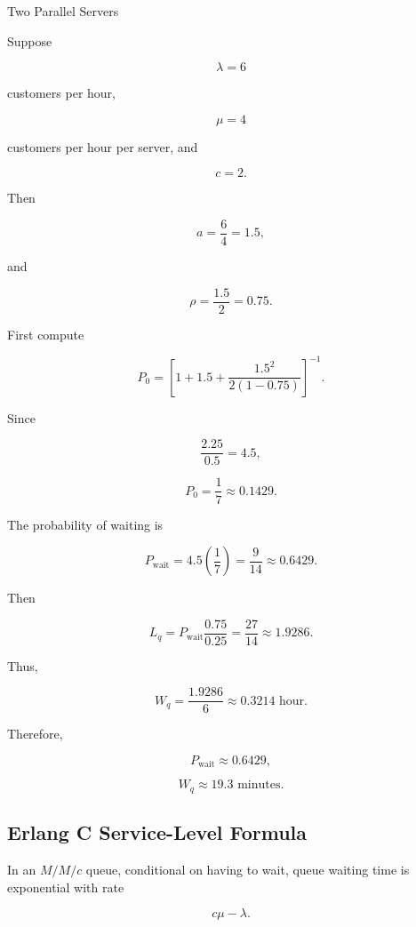 \begin{workedexamplebox}{Two Parallel Servers}

Suppose

\[
\lambda=6
\]

customers per hour,

\[
\mu=4
\]

customers per hour per server, and

\[
c=2.
\]

Then

\[
a
=
\frac64
=
1.5,
\]

and

\[
\rho
=
\frac{1.5}{2}
=
0.75.
\]

First compute

\[
P_0
=
\left[
1
+
1.5
+
\frac{
1.5^2
}{
2(1-0.75)
}
\right]^{-1}.
\]

Since

\[
\frac{2.25}{0.5}
=
4.5,
\]

\[
P_0
=
\frac1{7}
\approx0.1429.
\]

The probability of waiting is

\[
P_{\mathrm{wait}}
=
4.5
\left(
\frac17
\right)
=
\frac{9}{14}
\approx0.6429.
\]

Then

\[
L_q
=
P_{\mathrm{wait}}
\frac{0.75}{0.25}
=
\frac{27}{14}
\approx1.9286.
\]

Thus,

\[
W_q
=
\frac{
1.9286
}{
6
}
\approx0.3214
\text{ hour}.
\]

Therefore,

\begin{answerbox}
\[
\boxed{
P_{\mathrm{wait}}
\approx0.6429,
}
\]

\[
\boxed{
W_q
\approx19.3
\text{ minutes}.
}
\]
\end{answerbox}

\end{workedexamplebox}

\subsection{Erlang C Service-Level Formula}
\label{subsec:erlang-c-service-level}

In an \(M/M/c\) queue, conditional on having to wait, queue waiting time is
exponential with rate

\[
c\mu-\lambda.
\]

